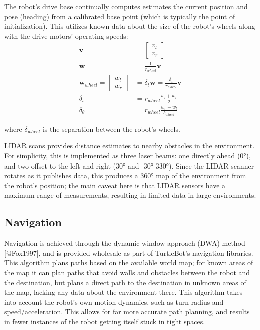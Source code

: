 \documentclass{article}
\begin{document}
The robot's drive base continually computes estimates the current position and pose (heading) from a calibrated base point (which is typically the point of initialization). This utilizes known data about the size of the robot's wheels along with the drive motors' operating speeds:
$$
\begin{aligned}
    \mathbf{v} &= \begin{bmatrix} v_{l} \\ v_{r} \end{bmatrix} \\
    \mathbf{w} &= \frac{1}{r_{wheel}} \mathbf{v} \\
    \mathbf{w}_{wheel} = \begin{bmatrix} w_{l} \\ w_{r} \end{bmatrix} &= \delta_t \mathbf{w} = \frac{\delta_t}{r_{wheel}} \mathbf{v} \\
    \delta_{s} &= r_{wheel} \frac{w_l + w_r}{2} \\
    \delta_{\theta} &= r_{wheel} \frac{w_r - w_l}{\delta_{wheel}}
\end{aligned}
$$


where $\delta_{wheel}$ is the separation between the robot's wheels.

LIDAR scans provides distance estimates to nearby obstacles in the environment. For simplicity, this is implemented as three laser beams: one directly ahead (0°), and two offset to the left and right (30° and -30°-330°). Since the LIDAR scanner rotates as it publishes data, this produces a 360° map of the environment from the robot's position; the main caveat here is that LIDAR sensors have a maximum range of measurements, resulting in limited data in large environments.

\subsection{Navigation}
Navigation is achieved through the dynamic window approach (DWA) method [@Fox1997], and is provided wholesale as part of TurtleBot's navigation libraries. This algorithm plans paths based on the available world map; for known areas of the map it can plan paths that avoid walls and obstacles between the robot and the destination, but plans a direct path to the destination in unknown areas of the map, lacking any data about the environment there. This algorithm takes into account the robot's own motion dynamics, such as turn radius and speed/acceleration. This allows for far more accurate path planning, and results in fewer instances of the robot getting itself stuck in tight spaces.
\end{document}
